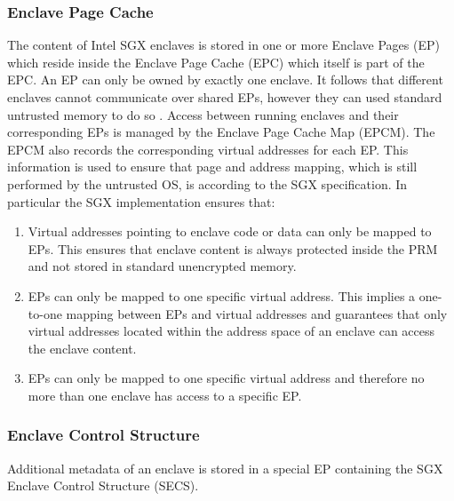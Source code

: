 \subsubsection{Enclave Page Cache}
The content of Intel SGX enclaves is stored in one or more Enclave Pages (EP) which reside inside the Enclave Page Cache (EPC) which itself is part of the EPC. An EP
can only be owned by exactly one enclave. It follows that different enclaves cannot communicate over shared EPs, however they can used standard untrusted memory to
do so \cite{Costan2016IntelSE}. Access between running enclaves and their corresponding EPs is managed by the Enclave Page Cache Map (EPCM). The EPCM also records
the corresponding virtual addresses for each EP. This information is used to ensure that page and address mapping, which is still performed by the untrusted OS, 
is according to the SGX specification. In particular the SGX implementation ensures that:
\begin{enumerate}
    \item Virtual addresses pointing to enclave code or data can only be mapped to EPs. This ensures that enclave content is always protected inside the PRM and not stored in
          standard unencrypted memory.
    \item EPs can only be mapped to one specific virtual address. This implies a one-to-one mapping between EPs and virtual addresses and guarantees that only virtual addresses
          located within the address space of an enclave can access the enclave content.
    \item EPs can only be mapped to one specific virtual address and therefore no more than one enclave has access to a specific EP.
\end{enumerate}

\subsubsection{Enclave Control Structure}
Additional metadata of an enclave is stored in a special EP containing the SGX Enclave Control Structure (SECS).